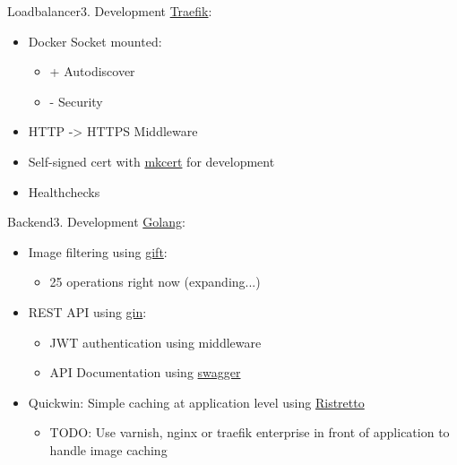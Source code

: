 \documentclass[aspectratio=169,20pt]{beamer}
\begin{document}
\begin{frame}{Loadbalancer}{3. Development}
	\underline{Traefik}:
	\begin{itemize}
		\item{Docker Socket mounted:}
		\begin{itemize}
			\item{+ Autodiscover}
			\item{- Security}
		\end{itemize}
		\item{HTTP -> HTTPS Middleware}
		\item{Self-signed cert with \href{https://github.com/FiloSottile/mkcert}{mkcert} for development}
		\item{Healthchecks}
	\end{itemize}
\end{frame}

\begin{frame}{Backend}{3. Development}
	\underline{Golang}:
	\begin{itemize}
		\item{Image filtering using \href{https://github.com/disintegration/gift}{gift}:}
		\begin{itemize}
			\item{25 operations right now (expanding...)}
		\end{itemize}
		\item{REST API using \href{https://github.com/gin-gonic/gin}{gin}:}
		\begin{itemize}
			\item{JWT authentication using middleware}
			\item{API Documentation using \href{https://github.com/swaggo/swag}{swagger}}
		\end{itemize}
		\item{Quickwin: Simple caching at application level using \href{https://github.com/dgraph-io/ristretto}{Ristretto}}
		\begin{itemize}
			\item{TODO: Use varnish, nginx or traefik enterprise in front of application to handle image caching}
		\end{itemize}
	\end{itemize}
\end{frame}
\end{document}
